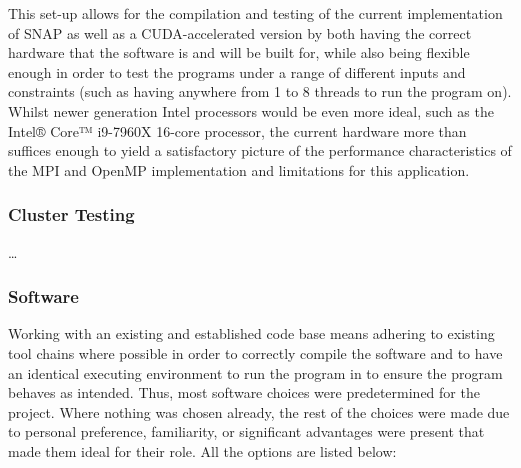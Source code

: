 \documentclass[conference]{IEEEtran}
\begin{document}
This set-up allows for the compilation and testing of the current implementation of SNAP as well as a CUDA-accelerated version by both having the correct hardware that the software is and will be built for, while also being flexible enough in order to test the programs under a range of different inputs and constraints (such as having anywhere from 1 to 8 threads to run the program on). Whilst newer generation Intel processors would be even more ideal, such as the Intel® Core™ i9-7960X 16-core processor, the current hardware more than suffices enough to yield a satisfactory picture of the performance characteristics of the MPI and OpenMP implementation and limitations for this application.

\subsubsection{Cluster Testing}

\dots

\subsubsection{Software}

Working with an existing and established code base means adhering to existing tool chains where possible in order to correctly compile the software and to have an identical executing environment to run the program in to ensure the program behaves as intended. Thus, most software choices were predetermined for the project. Where nothing was chosen already, the rest of the choices were made due to personal preference, familiarity, or significant advantages were present that made them ideal for their role. All the options are listed below:
\end{document}
